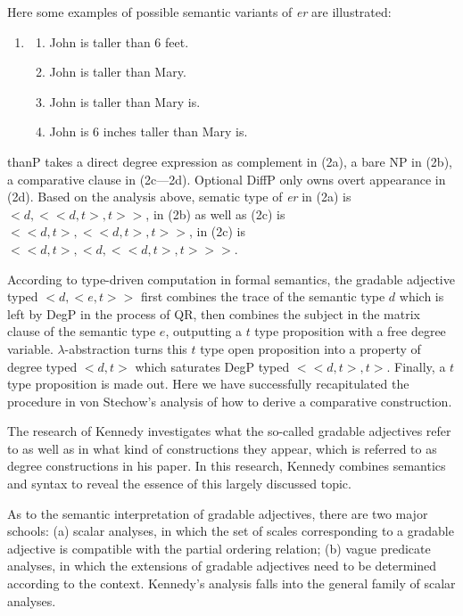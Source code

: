 \documentclass{ctexart}
\let \cite \parencite
\begin{document}
Here some examples of possible semantic variants of \textit{er} are illustrated:

\begin{enumerate}[resume]
\item

\begin{enumerate}
\item John is taller than 6 feet.
\item John is taller than Mary.
\item John is taller than Mary is.
\item John is 6 inches taller than Mary is.
\end{enumerate}

\end{enumerate}

thanP takes a direct degree expression as complement in (2a), a bare NP in (2b), a comparative clause in (2c—2d). Optional DiffP only owns overt appearance in (2d). Based on the analysis above, sematic type of \textit{er} in (2a) is $<d,<<d,t>,t>>$, in (2b) as well as (2c) is $<<d,t>,<<d,t>,t>>$, in (2c) is $<<d,t>,<d,<<d,t>,t>>>$.

According to type-driven computation in formal semantics, the gradable adjective typed $<d,<e,t>>$ first combines the trace of the semantic type $d$ which is left by DegP in the process of QR, then combines the subject in the matrix clause of the semantic type $e$, outputting a $t$ type proposition with a free degree variable. $\lambda$-abstraction turns this $t$ type open proposition into a property of degree typed $<d,t>$ which saturates DegP typed $<<d,t>,t>$. Finally, a $t$ type proposition is made out. Here we have successfully recapitulated the procedure in von Stechow’s analysis of how to derive a comparative construction.

The research of Kennedy investigates what the so-called gradable adjectives refer to as well as in what kind of constructions they appear, which is referred to as degree constructions in his paper\cite{kennedy1997}. In this research, Kennedy combines semantics and syntax to reveal the essence of this largely discussed topic.

As to the semantic interpretation of gradable adjectives, there are two major schools: (a) scalar analyses, in which the set of scales corresponding to a gradable adjective is compatible with the partial ordering relation\cite{cresswell1976,bierwisch1989}; (b) vague predicate analyses, in which the extensions of gradable adjectives need to be determined according to the context\cite{ginet1973,kamp2013,klein1980}. Kennedy’s analysis falls into the general family of scalar analyses.
\end{document}
